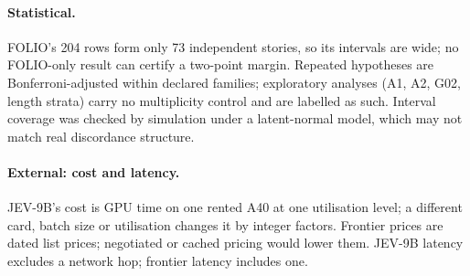 \paragraph{Statistical.}
FOLIO's 204 rows form only 73 independent stories, so its intervals are wide; no FOLIO-only result can certify a two-point margin.
Repeated hypotheses are Bonferroni-adjusted within declared families; exploratory analyses (A1, A2, G02, length strata) carry no multiplicity control and are labelled as such.
Interval coverage was checked by simulation under a latent-normal model, which may not match real discordance structure.

\paragraph{External: cost and latency.}
JEV-9B's cost is GPU time on one rented A40 at one utilisation level; a different card, batch size or utilisation changes it by integer factors.
Frontier prices are dated list prices; negotiated or cached pricing would lower them.
JEV-9B latency excludes a network hop; frontier latency includes one.
